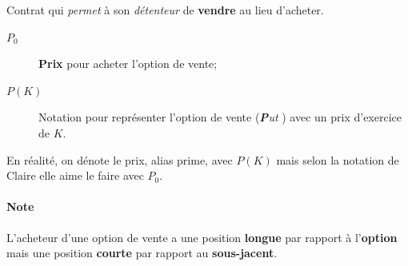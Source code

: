 \documentclass[10pt, french]{article}
\begin{document}
\begin{multicols*}{2}
\begin{definitionNOHFILL}
Contrat qui \textit{permet} à son \textit{détenteur} de \textbf{vendre} au lieu d'acheter.

\begin{distributions}[Notation]
\begin{description}
	\item[$P_{0}$]	\textbf{Prix} pour acheter l'option de vente;
	\item[$P(K)$]	Notation pour représenter l'option de vente (\og \textit{\textbf{P}ut} \fg{}) avec un prix d'exercice de $K$.
\end{description}
En réalité, on dénote le prix, alias prime,  avec $P(K)$ mais selon la notation de Claire elle aime le faire avec $P_{0}$.
\end{distributions}

\paragraph*{Note}	L'acheteur d'une option de vente a une position \textbf{longue} par rapport à l'\textbf{option} mais une position \textbf{courte} par rapport au \textbf{sous-jacent}.

%
\end{definitionNOHFILL}


\end{multicols*}
\end{document}
